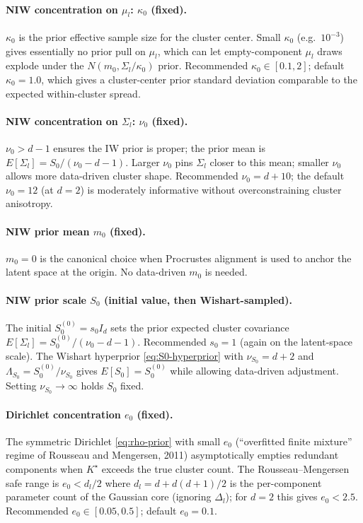 \documentclass[11pt]{article}
\begin{document}
\paragraph{NIW concentration on $\mu_l$: $\kappa_0$ (fixed).}
$\kappa_0$ is the prior effective sample size for the cluster center.
Small $\kappa_0$ (e.g.\ $10^{-3}$) gives essentially no prior pull on
$\mu_l$, which can let empty-component $\mu_l$ draws explode under the
$N(m_0,\Sigma_l/\kappa_0)$ prior.  Recommended $\kappa_0\in[0.1,2]$;
default $\kappa_0=1.0$, which gives a cluster-center prior standard
deviation comparable to the expected within-cluster spread.

\paragraph{NIW concentration on $\Sigma_l$: $\nu_0$ (fixed).}
$\nu_0>d-1$ ensures the IW prior is proper; the prior mean is
$E[\Sigma_l]=S_0/(\nu_0-d-1)$.  Larger $\nu_0$ pins $\Sigma_l$ closer to
this mean; smaller $\nu_0$ allows more data-driven cluster shape.
Recommended $\nu_0=d+10$; the default $\nu_0=12$ (at $d=2$) is moderately
informative without overconstraining cluster anisotropy.

\paragraph{NIW prior mean $m_0$ (fixed).}
$m_0=0$ is the canonical choice when Procrustes alignment is used to
anchor the latent space at the origin.  No data-driven $m_0$ is needed.

\paragraph{NIW prior scale $S_0$ (initial value, then Wishart-sampled).}
The initial $S_0^{(0)}=s_0 I_d$ sets the prior expected cluster
covariance $E[\Sigma_l]=S_0^{(0)}/(\nu_0-d-1)$.  Recommended $s_0=1$
(again on the latent-space scale).  The Wishart hyperprior
\eqref{eq:S0-hyperprior} with $\nu_{S_0}=d+2$ and
$\Lambda_{S_0}=S_0^{(0)}/\nu_{S_0}$ gives $E[S_0]=S_0^{(0)}$ while
allowing data-driven adjustment.  Setting $\nu_{S_0}\to\infty$ holds
$S_0$ fixed.

\paragraph{Dirichlet concentration $e_0$ (fixed).}
The symmetric Dirichlet \eqref{eq:rho-prior} with small $e_0$
(``overfitted finite mixture'' regime of Rousseau and Mengersen, 2011)
asymptotically empties redundant components when $K^\star$ exceeds the
true cluster count.  The Rousseau--Mengersen safe range is
$e_0<d_l/2$ where $d_l=d+d(d+1)/2$ is the per-component parameter
count of the Gaussian core (ignoring $\Delta_l$); for $d=2$ this gives
$e_0<2.5$.  Recommended $e_0\in[0.05,0.5]$; default $e_0=0.1$.
\end{document}
